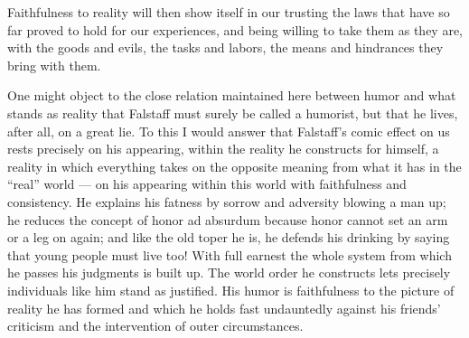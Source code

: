 \documentclass[12pt]{book}
\begin{document}
Faithfulness to reality will then show itself in our trusting the laws that have so far
proved to hold for our experiences, and being willing to take them as they are, with the
goods and evils, the tasks and labors, the means and hindrances they bring with them.

One might object to the close relation maintained here between humor and what stands as
reality that Falstaff must surely be called a humorist, but that he lives, after all, on a
great lie. To this I would answer that Falstaff's comic effect on us rests precisely on
his appearing, within the reality he constructs for himself, a reality in which everything
takes on the opposite meaning from what it has in the ``real'' world --- on his appearing
within this world with faithfulness and consistency. He explains his fatness by sorrow and
adversity blowing a man up; he reduces the concept of honor ad absurdum because honor
cannot set an arm or a leg on again; and like the old toper he is, he defends his drinking
by saying that young people must live too! With full earnest the whole system from which he
passes his judgments is built up. The world order he constructs lets precisely individuals
like him stand as justified. His humor is faithfulness to the picture of reality he has
formed and which he holds fast undauntedly against his friends' criticism and the
intervention of outer circumstances.
\end{document}
